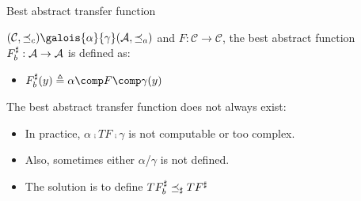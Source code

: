 \begin{frame}{Best abstract transfer function}
\begin{definition}
$(\mathcal{C}, \preceq_c) \galois{\alpha}{\gamma} (\mathcal{A}, \preceq_a)$ and $F:\mathcal{C} \rightarrow \mathcal{C}$, the best abstract function $F^{\scriptsize \sharp}_b: \mathcal{A}\rightarrow\mathcal{A}$ is defined as:
\begin{itemize}
	\item $F^{\scriptsize \sharp}_b(y) \triangleq \alpha \comp F \comp \gamma (y)$
\end{itemize}
\end{definition}

 \begin{alertblock}{The best abstract transfer function does not always exist:}
 	\begin{itemize}
	\item In practice, $\alpha \comp TF \comp \gamma$ is not computable or too complex.
	\item Also, sometimes either  $\alpha$/$\gamma$ is not defined.	
	\item The solution is to define  $ TF^{\scriptsize \sharp}_b\preceq_\sharp TF^{\scriptsize \sharp} $
    \end{itemize}
\end{alertblock}
\end{frame}


